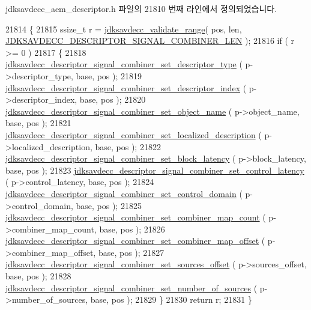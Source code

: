 jdksavdecc\+\_\+aem\+\_\+descriptor.\+h 파일의 21810 번째 라인에서 정의되었습니다.


\begin{DoxyCode}
21814 \{
21815     ssize\_t r = \hyperlink{group__util_ga9c02bdfe76c69163647c3196db7a73a1}{jdksavdecc\_validate\_range}( pos, len, 
      \hyperlink{group__descriptor__signal__combiner_gadfdbfd7d2f63bf0ae8b9f7057823623c}{JDKSAVDECC\_DESCRIPTOR\_SIGNAL\_COMBINER\_LEN} );
21816     \textcolor{keywordflow}{if} ( r >= 0 )
21817     \{
21818         \hyperlink{group__descriptor__signal__combiner_ga611bc66a433b751053c8b63d38a9c07f}{jdksavdecc\_descriptor\_signal\_combiner\_set\_descriptor\_type}
      ( p->descriptor\_type, base, pos );
21819         \hyperlink{group__descriptor__signal__combiner_gab8c10bcf6709c9a41edbd1452141abae}{jdksavdecc\_descriptor\_signal\_combiner\_set\_descriptor\_index}
      ( p->descriptor\_index, base, pos );
21820         \hyperlink{group__descriptor__signal__combiner_ga1b383e3ece9706c99e7edadd87cea3f3}{jdksavdecc\_descriptor\_signal\_combiner\_set\_object\_name}
      ( p->object\_name, base, pos );
21821         \hyperlink{group__descriptor__signal__combiner_ga0d699c4d40a2ed264f21468c4bcda7fc}{jdksavdecc\_descriptor\_signal\_combiner\_set\_localized\_description}
      ( p->localized\_description, base, pos );
21822         \hyperlink{group__descriptor__signal__combiner_ga196d5482e33364493680cc44c7610eee}{jdksavdecc\_descriptor\_signal\_combiner\_set\_block\_latency}
      ( p->block\_latency, base, pos );
21823         \hyperlink{group__descriptor__signal__combiner_gaa157902fa0e69bd84f8f6d3d8d29c094}{jdksavdecc\_descriptor\_signal\_combiner\_set\_control\_latency}
      ( p->control\_latency, base, pos );
21824         \hyperlink{group__descriptor__signal__combiner_ga5a50c191fd5c89621c4014c6f3b731c6}{jdksavdecc\_descriptor\_signal\_combiner\_set\_control\_domain}
      ( p->control\_domain, base, pos );
21825         \hyperlink{group__descriptor__signal__combiner_ga4d89c332e69f8dd38afd3851a477ef39}{jdksavdecc\_descriptor\_signal\_combiner\_set\_combiner\_map\_count}
      ( p->combiner\_map\_count, base, pos );
21826         \hyperlink{group__descriptor__signal__combiner_gae84470bf686a2904a0f7041112da98e0}{jdksavdecc\_descriptor\_signal\_combiner\_set\_combiner\_map\_offset}
      ( p->combiner\_map\_offset, base, pos );
21827         \hyperlink{group__descriptor__signal__combiner_ga909896034ca5de747f1e657279e7ac43}{jdksavdecc\_descriptor\_signal\_combiner\_set\_sources\_offset}
      ( p->sources\_offset, base, pos );
21828         \hyperlink{group__descriptor__signal__combiner_ga1b9d7d4c7b165190040636377fb70183}{jdksavdecc\_descriptor\_signal\_combiner\_set\_number\_of\_sources}
      ( p->number\_of\_sources, base, pos );
21829     \}
21830     \textcolor{keywordflow}{return} r;
21831 \}
\end{DoxyCode}


